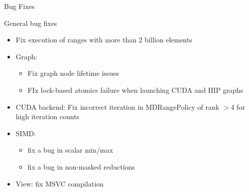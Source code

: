 




\begin{frame}[fragile]

  {\Huge Bug Fixes}

  \vspace{10pt}

\end{frame}

\begin{frame}[fragile]{General bug fixes}
  \begin{itemize}
      \item Fix execution of ranges with more than 2 billion elements
      \item Graph:
      \begin{itemize}
        \item Fix graph node lifetime issues
        \item FIx lock-based atomics failure when launching CUDA and HIP graphs
      \end{itemize}
      \item CUDA backend: Fix incorrect iteration in MDRangePolicy of rank $> 4$ for high iteration counts
      \item SIMD:
      \begin{itemize}
        \item fix a bug in scalar min/max
        \item fix a bug in non-masked reductions
      \end{itemize}
      \item View: fix MSVC compilation
  \end{itemize}
 \end{frame}

